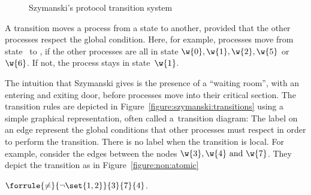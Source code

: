 \begin{wrapfigure}{r}[0pt]{0.61\linewidth}
  \vspace{-3pt}
  \hfill
  \caption{Szymanski's protocol transition system}
  \label{figure:szymanski:transitions}
  \label{figure:szymanski:diagram}
\end{wrapfigure}
%
A transition moves a process from a state to another, provided that
the other processes respect the global condition. %
Here, for example, processes move from state~ to , if the
other processes are all in state $\w{0}, \w{1}, \w{2}, \w{5}$
or~$\w{6}$. %
If not, the process stays in state~$\w{1}$.

The intuition that Szymanski gives is the presence of a ``waiting
room'', with an entering and exiting door, before processes move into
their critical section.
%
The transition rules are depicted in
Figure~\ref{figure:szymanski:transitions} using a simple graphical
representation, often called a~transition diagram: The label on an
edge represent the global conditions that other processes must respect
in order to perform the transition. There is no label when the
transition is local.
%
For example, consider the edges between the nodes %
$\w{3}, \w{4}\text{ and }\w{7}$. %
They depict the transition as in Figure~\ref{figure:non:atomic}\\%
\parbox{\textwidth}{\centering $\forrule{\neq}{\neg\set{1,2}}{3}{7}{4}$.}



